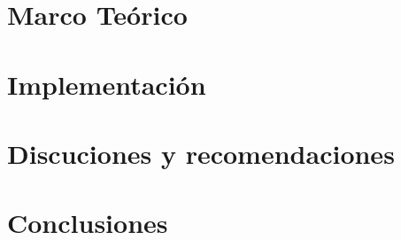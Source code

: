 \documentclass{report}
\begin{document}
\lstset{language=Haskell}

\section{Marco Teórico}




\pagebreak
\section{Implementación}


\pagebreak
\section{Discuciones y recomendaciones}


\pagebreak
\section{Conclusiones}


%

\pagebreak



{}
\end{document}
